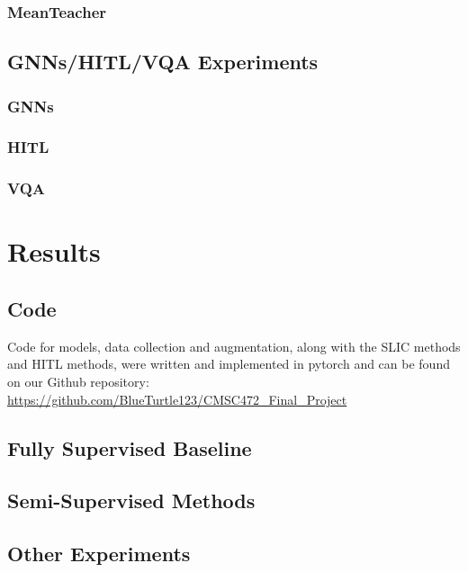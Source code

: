 \documentclass{article}
\begin{document}
\subsubsection{MeanTeacher}

\subsection{GNNs/HITL/VQA Experiments}


\subsubsection{GNNs}

\subsubsection{HITL}

\subsubsection{VQA}

\section{Results}
\label{result}

\subsection{Code}

Code for models, data collection and augmentation, along with the SLIC methods and HITL methods, were written and implemented in pytorch and can be found on our Github repository: \url{https://github.com/BlueTurtle123/CMSC472_Final_Project}

\subsection{Fully Supervised Baseline}


\subsection{Semi-Supervised Methods}


\subsection{Other Experiments}
\end{document}
